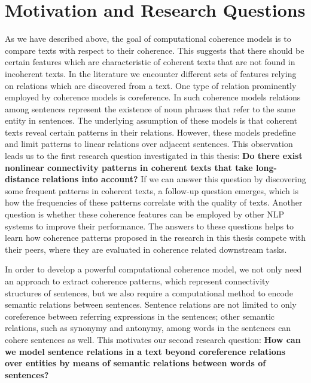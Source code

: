 \section{Motivation and Research Questions}
\label{sec:intro-motivation}

As we have described above, the goal of computational coherence models is to compare texts with respect to their coherence. 
This suggests that there should be certain features which are characteristic of coherent texts that are not found in incoherent texts. 
In the literature we encounter different sets of features relying on relations which are discovered from a text. 
One type of relation prominently employed by coherence models is coreference. 
In such coherence models relations among sentences represent the existence of noun phrases that refer to the same entity in sentences. 
The underlying assumption of these models is that coherent texts reveal certain patterns in their relations. 
However, these models predefine and limit patterns to linear relations over adjacent sentences. 
This observation leads us to the first research question investigated in this thesis: 
\textbf{Do there exist nonlinear connectivity patterns in coherent texts that take long-distance relations into account?} 
If we can answer this question by discovering some frequent patterns in coherent texts, a follow-up question emerges, which is how the frequencies of these patterns correlate with the quality of texts. 
Another question is whether these coherence features can be employed by other NLP systems to improve their performance. 
The answers to these questions helps to learn how coherence patterns proposed in the research in this thesis compete with their peers, where they are evaluated in coherence related downstream tasks. 

In order to develop a powerful computational coherence model, we not only need an approach to extract coherence patterns, which represent connectivity structures of sentences, but we also require a computational method to encode semantic relations between sentences. 
Sentence relations are not limited to only coreference between referring expressions in the sentences; other semantic relations, such as synonymy and antonymy, among words in the sentences can cohere sentences as well. 
This motivates our second research question: 
\textbf{How can we model sentence relations in a text beyond coreference relations over entities by means of semantic relations between words of sentences?} 

